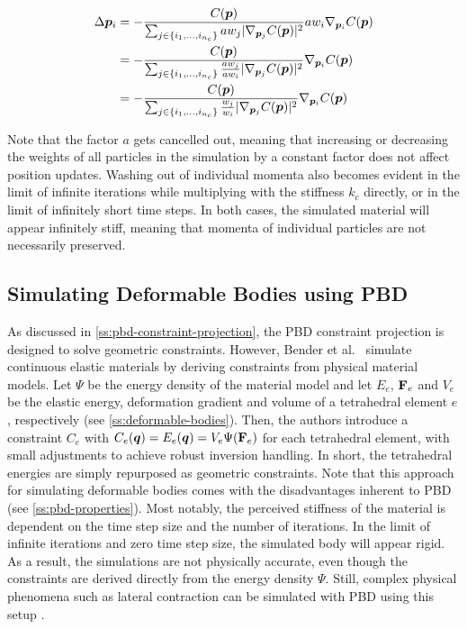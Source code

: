 \begin{equation}\label{eq:pbd-masses}
    \begin{split}
        \Delta \bm{p}_i 
        &= -\frac{C(\bm{p})}{\sum_{j \in \{ i_1, \ldots, i_{n_c} \}} aw_j \vert \nabla_{\bm{p}_j}C(\bm{p}) \vert^2 } aw_i \nabla_{\bm{p}_i} C(\bm{p}) \\
        &= -\frac{C(\bm{p})}{\sum_{j \in \{ i_1, \ldots, i_{n_c} \}} \frac{aw_j}{aw_i} \vert \nabla_{\bm{p}_j}C(\bm{p}) \vert^2 } \nabla_{\bm{p}_i} C(\bm{p}) \\
        &= -\frac{C(\bm{p})}{\sum_{j \in \{ i_1, \ldots, i_{n_c} \}} \frac{w_j}{w_i} \vert \nabla_{\bm{p}_j}C(\bm{p}) \vert^2 } \nabla_{\bm{p}_i} C(\bm{p})
    \end{split}
\end{equation}

\noindent Note that the factor $a$ gets cancelled out, meaning that increasing or decreasing the weights of all particles in the simulation by a constant
factor does not affect position updates. Washing out of individual momenta also becomes evident in the limit of infinite iterations while multiplying 
with the stiffness $k_c$ directly, or in the limit of infinitely short time steps. In both cases, the simulated material will appear infinitely stiff, 
meaning that momenta of individual particles are not necessarily preserved.

\subsection{Simulating Deformable Bodies using PBD}\label{ss:pbd-deformable-bodies}
As discussed in \autoref{ss:pbd-constraint-projection}, the PBD constraint projection is designed to solve geometric constraints. However, Bender et al.\ 
\cite{bender2014} simulate continuous elastic materials by deriving constraints from physical material models. Let $\Psi$ be the energy density of the 
material model and let $E_e$, $\mathbf{F}_e$ and $V_e$ be the elastic energy, deformation gradient and volume of a tetrahedral element $e$, respectively
(see \cref{ss:deformable-bodies}). Then, the authors introduce a constraint $C_e$ with $C_e(\bm{q}) = E_e(\bm{q}) = V_e\Psi(\mathbf{F}_e)$ for each 
tetrahedral element, with small adjustments to achieve robust inversion handling. In short, the tetrahedral energies are simply repurposed as geometric 
constraints. Note that this approach for simulating 
deformable bodies comes with the disadvantages inherent to PBD (see \cref{ss:pbd-properties}). Most notably, the perceived stiffness of the material is 
dependent on the time step size and the number of iterations. In the limit of infinite iterations and zero time step size, the simulated body will 
appear rigid. As a result, the simulations are not physically accurate, even though the constraints are derived directly from the energy density $\Psi$. 
Still, complex physical phenomena such as lateral contraction can be simulated with PBD using this setup \cite{bender2014}.

